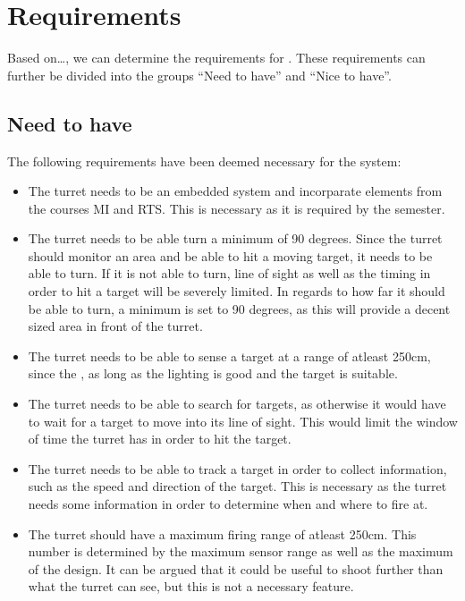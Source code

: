\section{Requirements}

Based on\ldots, we can determine the requirements for \namep. These requirements
can further be divided into the groups ``Need to have'' and ``Nice to have''.

\subsection{Need to have}
The following requirements have been deemed necessary for the system:

\begin{itemize}
  \item The turret needs to be an embedded system and incorparate elements from
  the courses MI and RTS. This is necessary as it is required by the semester.
  \item The turret needs to be able turn a minimum of 90 degrees. Since the
  turret should monitor an area and be able to hit a moving target, it needs to
  be able to turn. If it is not able to turn, line of sight as well as the
  timing in order to hit a target will be severely limited. In regards to how
  far it should be able to turn, a minimum is set to 90 degrees, as this will
  provide a decent sized area in front of the turret.
  \item The turret needs to be able to sense a target at a range of atleast
  250cm, since the , as long as the
  lighting is good and the target is suitable.
  \item The turret needs to be able to search for targets, as otherwise it would
  have to wait for a target to move into its line of sight. This would limit
  the window of time the turret has in order to hit the target.
  \item The turret needs to be able to track a target in order to collect
  information, such as the speed and direction of the target. This is necessary
  as the turret needs some information in order to determine when and where to
  fire at.
  \item The turret should have a maximum firing range of atleast 250cm. This
  number is determined by the maximum sensor range as well as the maximum of
  the design. It can be argued that it could be useful to shoot further than
  what the turret can see, but this is not a necessary feature.

\end{itemize}
